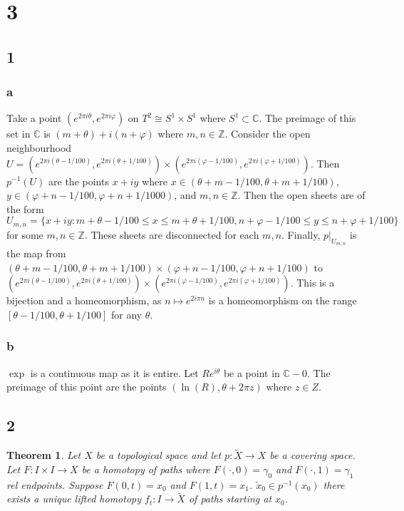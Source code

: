 \documentclass{article}
\newtheorem{theorem}{Theorem}
\theoremstyle{definition}
\numberwithin{theorem}{section}
\numberwithin{equation}{section}
\newcommand{\cover}{\widetilde{X}}
\begin{document}
\section{3}

\subsection{1}
\subsubsection*{a}
Take a point $(e^{2\pi i \theta}, e^{2 \pi i \varphi})$ on $T^2 \cong S^1 \times S^1$ where $S^1 \subset \mathbb{C}$. The preimage of this set in $\mathbb{C}$ is $(m + \theta) + i (n + \varphi)$ where $m, n \in \mathbb{Z}$. Consider the open neighbourhood $U = (e^{2 \pi i (\theta - 1/100)}, e^{2 \pi i (\theta + 1/100)}) \times (e^{2 \pi i (\varphi - 1/100)}, e^{2 \pi i (\varphi + 1/100)})$. Then $p^{-1}(U)$ are the points $x + i y$ where $x \in (\theta + m -1/100, \theta + m + 1/100)$, $y \in (\varphi + n - 1/100, \varphi + n + 1/1000)$, and $m, n \in \mathbb{Z}$. Then the open sheets are of the form $U_{m,n} = \{x + i y : m + \theta - 1/100 \leq x \leq m + \theta + 1/100, n + \varphi - 1/100 \leq y \leq n + \varphi + 1/100\}$ for some $m, n \in \mathbb{Z}$. These sheets are disconnected for each $m, n$. Finally, $p|_{U_{m,n}}$ is the map from $(\theta + m -1/100, \theta + m + 1/100) \times (\varphi + n - 1/100, \varphi + n + 1/100)$ to $(e^{2 \pi i (\theta - 1/100)}, e^{2 \pi i (\theta + 1/100)}) \times (e^{2 \pi i (\varphi - 1/100)}, e^{2 \pi i (\varphi + 1/100)})$. This is a bijection and a homeomorphism, as $n \mapsto e^{2 i \pi n}$ is a homeomorphism on the range $[\theta - 1/100, \theta + 1/100]$ for any $\theta$. 

\subsubsection*{b}
$\exp$ is a continuous map as it is entire. Let $R e^{i \theta}$ be a point in $\mathbb{C} - 0$. The preimage of this point are the points $(\ln(R), \theta + 2 \pi z)$ where $z \in Z$.

\subsection{2}

\begin{theorem}
    Let $X$ be a topological space and let $p : \cover \rightarrow X$ be a covering space. Let $F: I \times I \rightarrow X$ be a homotopy of paths where $F(\cdot, 0) = \gamma_0$ and $F(\cdot, 1) = \gamma_1$ rel endpoints. Suppose $F(0,t) = x_0$ and $F(1, t)= x_1$. $\tilde{x}_0 \in p^{-1}(x_0)$ there exists a unique lifted homotopy $f_t: I \rightarrow \cover$ of paths starting at $x_0$.
\end{theorem}
\end{document}
